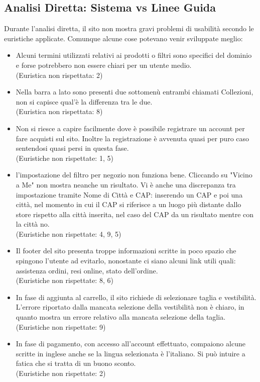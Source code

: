 \documentclass[12pt,a4paper]{report}
\begin{document}
\subsection{Analisi Diretta: Sistema vs Linee Guida}
Durante l'analisi diretta, il sito non mostra gravi problemi di usabilità secondo le euristiche applicate. Comunque alcune cose potevano venir sviluppate meglio:
\begin{itemize}
  \item Alcuni termini utilizzati relativi ai prodotti o filtri sono specifici del dominio e forse potrebbero non essere chiari per un utente medio.\\
  (Euristica non rispettata: 2)
  \item Nella barra a lato sono presenti due sottomenù entrambi chiamati Collezioni, non si capisce qual'è la differenza tra le due.\\
  (Euristica non rispettata: 8)
  \item Non si riesce a capire facilmente dove è possibile registrare un account per fare acquisti sul sito. Inoltre la registrazione è avvenuta quasi per puro caso sentendosi quasi persi in questa fase.\\
  (Euristiche non rispettate: 1, 5)
  \item l'impostazione del filtro per negozio non funziona bene. Cliccando su "Vicino a Me" non mostra neanche un risultato. Vi è anche una discrepanza tra impostazione tramite Nome di Città e CAP: inserendo un CAP e poi una città, nel momento in cui il CAP si riferisce a un luogo più distante dallo store rispetto alla città inserita, nel caso del CAP da un risultato mentre con la città no.\\
  (Euristiche non rispettate: 4, 9, 5)
  \item Il footer del sito presenta troppe informazioni scritte in poco spazio che spingono l'utente ad evitarlo, nonostante ci siano alcuni link utili quali: assistenza ordini, resi online, stato dell'ordine.\\
  (Euristiche non rispettate: 8, 6)
  \item In fase di aggiunta al carrello, il sito richiede di selezionare taglia e vestibilità. L'errore riportato dalla mancata selezione della vestibilità non è chiaro, in quanto mostra un errore relativo alla mancata selezione della taglia.\\
  (Euristiche non rispettate: 9)
  \item In fase di pagamento, con accesso all'account effettuato, compaiono alcune scritte in inglese anche se la lingua selezionata è l'italiano. Si può intuire a fatica che si tratta di un buono sconto.\\
  (Euristiche non rispettate: 2)
\end{itemize}
\end{document}
